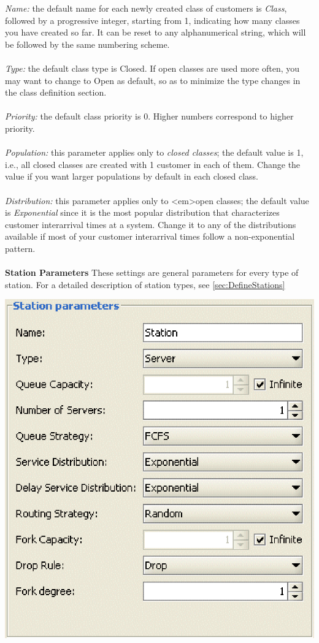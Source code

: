 \emph{Name:} the default name for each newly created class of customers is \emph{Class}, followed by a progressive integer, starting from 1, indicating how many classes you have created so far. It can be reset to any alphanumerical string, which will be followed by the same numbering scheme.\\\\
\emph{Type:}
the default class type is Closed. If open classes are used more often, you may want to change to Open as default, so as to minimize the type changes in the class definition section.\\\\
\emph{Priority:}
the default class priority is 0. Higher numbers correspond to higher priority.\\\\
\emph{Population:}
this parameter applies only to \emph{closed classes}; the default value is 1, i.e., all closed classes are created with 1 customer in each of them. Change the value if you want larger populations by default in each closed class.\\\\
\emph{Distribution:}
this parameter applies only to <em>open classes; the default value is \emph{Exponential} since it is the most popular distribution that characterizes customer interarrival times at a system. Change it to any of the distributions available if most of your customer interarrival times follow a non-exponential pattern.\\\\
\textbf{Station Parameters}
These settings are general parameters for every type of station. For a detailed description of station types, see \autoref{sec:DefineStations}
\begin{center}
\includegraphics[scale=.5]{img/jsim/Station_parameters.eps}
\end{center}
